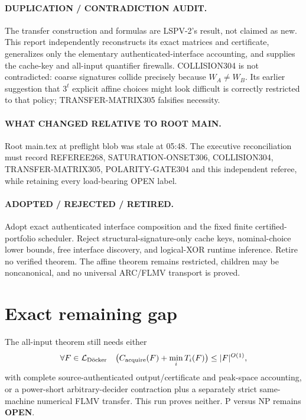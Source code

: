 \documentclass[11pt]{article}
\begin{document}
\paragraph{DUPLICATION / CONTRADICTION AUDIT.}
The transfer construction and formulas are LSPV-2's result, not claimed as new.  This report independently reconstructs its exact matrices and certificate, generalizes only the elementary authenticated-interface accounting, and supplies the cache-key and all-input quantifier firewalls.  COLLISION304 is not contradicted: coarse signatures collide precisely because $W_A\ne W_B$.  Its earlier suggestion that $3^t$ explicit affine choices might look difficult is correctly restricted to that policy; TRANSFER-MATRIX305 falsifies necessity.

\paragraph{WHAT CHANGED RELATIVE TO ROOT MAIN.}
Root main.tex at preflight blob  was stale at 05:48.  The executive reconciliation must record REFEREE268, SATURATION-ONSET306, COLLISION304, TRANSFER-MATRIX305, POLARITY-GATE304 and this independent referee, while retaining every load-bearing OPEN label.

\paragraph{ADOPTED / REJECTED / RETIRED.}
Adopt exact authenticated interface composition and the fixed finite certified-portfolio scheduler.  Reject structural-signature-only cache keys, nominal-choice lower bounds, free interface discovery, and logical-XOR runtime inference.  Retire no verified theorem.  The affine theorem remains restricted, children may be noncanonical, and no universal ARC/FLMV transport is proved.

\section{Exact remaining gap}
The all-input theorem still needs either
\[
 \forall F\in\mathcal L_{\rm D\ddot{o}cker}\quad
 \bigl(C_{\rm acquire}(F)+\min_iT_i(F)\bigr)\le |F|^{O(1)},
\]
with complete source-authenticated output/certificate and peak-space accounting, or a power-short arbitrary-decider contraction plus a separately strict same-machine numerical FLMV transfer.  This run proves neither.  P versus NP remains \textbf{OPEN}.
\end{document}
